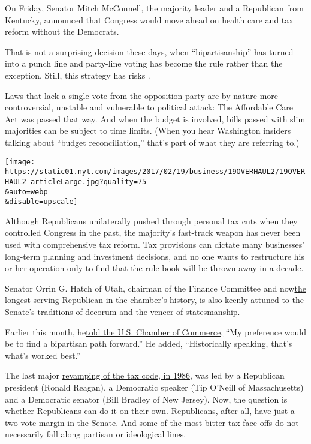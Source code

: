 On Friday, Senator Mitch McConnell, the majority leader and a Republican
from Kentucky, announced that Congress would move ahead on health care
and tax reform without the Democrats.

That is not a surprising decision these days, when ``bipartisanship''
has turned into a punch line and party-line voting has become the rule
rather than the exception. Still, this strategy has risks .

Laws that lack a single vote from the opposition party are by nature
more controversial, unstable and vulnerable to political attack: The
Affordable Care Act was passed that way. And when the budget is
involved, bills passed with slim majorities can be subject to time
limits. (When you hear Washington insiders talking about ``budget
reconciliation,'' that's part of what they are referring to.)

\texttt{[image: https://static01.nyt.com/images/2017/02/19/business/19OVERHAUL2/19OVERHAUL2-articleLarge.jpg?quality=75\\\&auto=webp\\\&disable=upscale]}

Although Republicans unilaterally pushed through personal tax cuts when
they controlled Congress in the past, the majority's fast-track weapon
has never been used with comprehensive tax reform. Tax provisions can
dictate many businesses' long-term planning and investment decisions,
and no one wants to restructure his or her operation only to find that
the rule book will be thrown away in a decade.

Senator Orrin G. Hatch of Utah, chairman of the Finance Committee and
now\href{http://www.cnn.com/2017/02/09/politics/orrin-hatch-senate-honor/}{the
longest-serving Republican in the chamber's history}, is also keenly
attuned to the Senate's traditions of decorum and the veneer of
statesmanship.

Earlier this month,
he\href{https://www.finance.senate.gov/chairmans-news/hatch-unveils-finance-committee-agenda-for-115th-congress-}{told
the U.S. Chamber of Commerce,} ``My preference would be to find a
bipartisan path forward.'' He added, ``Historically speaking, that's
what's worked best.''

The last major
\href{http://www.nytimes.com/2012/11/23/business/a-starting-point-for-tax-reform-what-reagan-did.html}{revamping
of the tax code, in 1986,} was led by a Republican president (Ronald
Reagan), a Democratic speaker (Tip O'Neill of Massachusetts) and a
Democratic senator (Bill Bradley of New Jersey). Now, the question is
whether Republicans can do it on their own. Republicans, after all, have
just a two-vote margin in the Senate. And some of the most bitter tax
face-offs do not necessarily fall along partisan or ideological lines.

